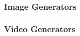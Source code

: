 \begin{frame}
    \frametitle{Image Generators}
    
    \begin{figure}
       \centering
    \end{figure}

\end{frame}

\begin{frame}
    \frametitle{Video Generators}
    
    \begin{figure}
       \centering
    \end{figure}

\end{frame}

